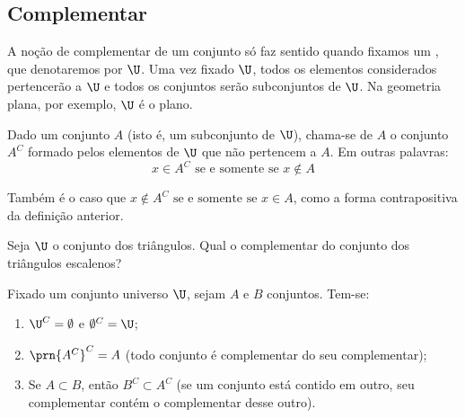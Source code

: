 \subsection{Complementar}
A noção de complementar de um conjunto só faz sentido quando fixamos um , que denotaremos por $\U$. Uma vez fixado $\U$, todos os elementos considerados pertencerão a $\U$ e todos os conjuntos serão subconjuntos de $\U$. Na geometria plana, por exemplo, $\U$ é o plano.

\begin{definition}
Dado um conjunto $A$ (isto é, um subconjunto de $\U$), chama-se  de $A$ o conjunto $A^C$ formado pelos elementos de $\U$ que não pertencem a $A$. Em outras palavras:
	$$ x \in A^C \text{ se e somente se } x \notin A $$
\end{definition}

\begin{remark}
	Também é o caso que $ x \notin A^C \text{ se e somente se } x \in A $, como a forma contrapositiva da definição anterior.
\end{remark}

\begin{example}
Seja $\U$ o conjunto dos triângulos. Qual o complementar do conjunto dos triângulos escalenos?
\end{example}

\begin{proposition}
\label{prop-complementar}
Fixado um conjunto universo $\U$, sejam $A$ e $B$ conjuntos. Tem-se:
%
\begin{enumerate}
	\item $\U^C=\emptyset$ e $\emptyset^C = \U$;
	\item $\prn{A^C}^C=A$ (todo conjunto é complementar do seu complementar);
	\item Se $A \subset B$, então $B^C \subset A^C$ (se um conjunto está contido em outro, seu complementar contém o complementar desse outro). 
\end{enumerate}
\end{proposition}

